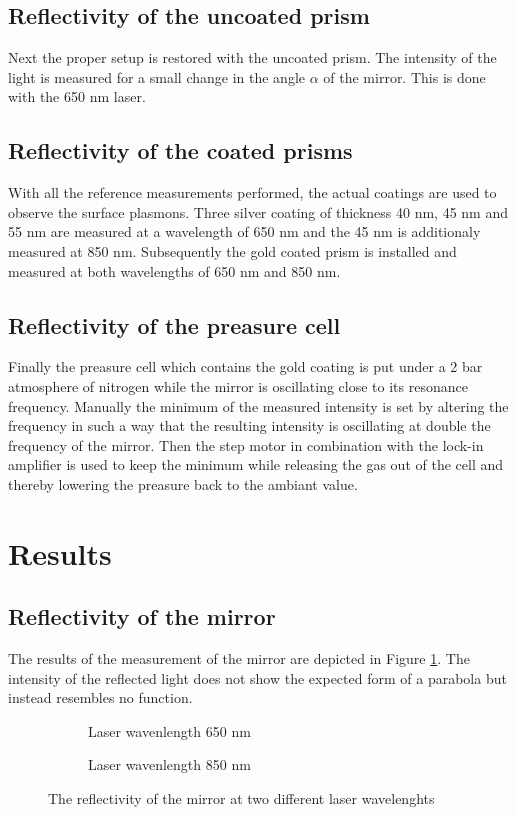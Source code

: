 \documentclass[twoside,english,headsepline=on,DIV=11]{scrartcl}
\numberwithin{equation}{section}
\begin{document}
\subsection{Reflectivity of the uncoated prism}
Next the proper setup is restored with the uncoated prism. The intensity of the light is measured for a small change in the angle $\alpha$ of the mirror. This is done with the 650 nm laser.
\subsection{Reflectivity of the coated prisms}
With all the reference measurements performed, the actual coatings are used to observe the surface plasmons. Three silver coating of thickness 40 nm, 45 nm and 55 nm are measured at a wavelength of 650 nm and the 45 nm is additionaly measured at 850 nm. Subsequently the gold coated prism is installed and measured at both wavelengths of 650 nm and 850 nm. 
\subsection{Reflectivity of the preasure cell}
Finally the preasure cell which contains the gold coating is put under a 2 bar atmosphere of nitrogen while the mirror is oscillating close to its resonance frequency. Manually the minimum of the measured intensity is set by altering the frequency in such a way that the resulting intensity is oscillating at double the frequency of the mirror. Then the step motor in combination with the lock-in amplifier is used to keep the minimum while releasing the gas out of the cell and thereby lowering the preasure back to the ambiant value. 

\section{Results}
\subsection{Reflectivity of the mirror}
The results of the measurement of the mirror are depicted in Figure \ref{fig:mirror}. The intensity of the reflected light does not show the expected form of a parabola but instead resembles no function. 
\begin{figure}
	\begin{subfigure}{.48\textwidth}
		
		\caption{Laser wavenlength 650 nm}
	\end{subfigure}
	\begin{subfigure}{.48\textwidth}
		
		\caption{Laser wavenlength 850 nm}
	\end{subfigure}
	\caption{The reflectivity of the mirror at two different laser wavelenghts}
	\label{fig:mirror}
\end{figure}
\end{document}
